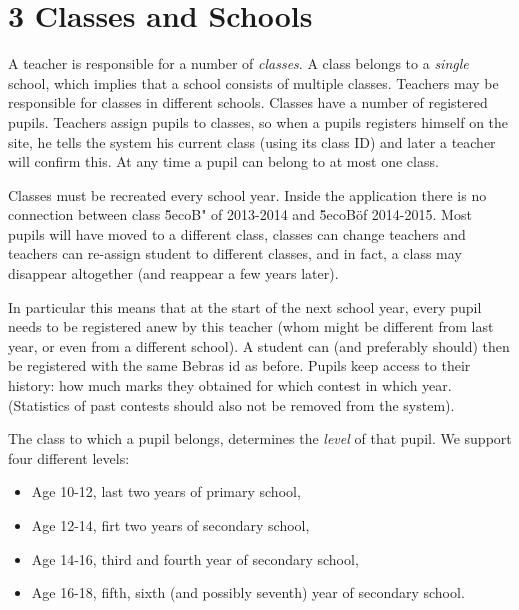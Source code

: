 
\section*{3 Classes and Schools}

A teacher is responsible for a number of \emph{classes}. A class belongs to a \emph{single} school, which implies that a school consists of multiple classes. Teachers may be responsible for classes in different schools. Classes have a number of registered pupils. Teachers assign pupils to classes, so when a pupils registers himself on the site, he tells the system his current class (using its class ID) and later a teacher will confirm this. At any time a pupil can belong to at most one class. 

Classes must be recreated every school year. Inside the application there is no connection between class \"5ecoB" of 2013-2014 and \"5ecoB\" of 2014-2015. Most pupils will have moved to a different class, classes can change teachers and teachers can re-assign student to different classes, and in fact, a class may disappear altogether (and reappear a few years later).

In particular this means that at the start of the next school year, every pupil needs to be registered anew by this teacher (whom might be different from last year, or even from a different school). A student can (and preferably should) then be registered with the same Bebras id as before. Pupils keep access to their history: how much marks they obtained for which contest in which year. 
(Statistics of past contests should also not be removed from the system).

The class to which a pupil belongs, determines the \emph{level} of that pupil. We support four different levels:
\begin{itemize}
\item Age 10-12, last two years of primary school,
\item Age 12-14, firt two years of secondary school,
\item Age 14-16, third and fourth year of secondary school,
\item Age 16-18, fifth, sixth (and possibly seventh) year of secondary school.
\end{itemize}
